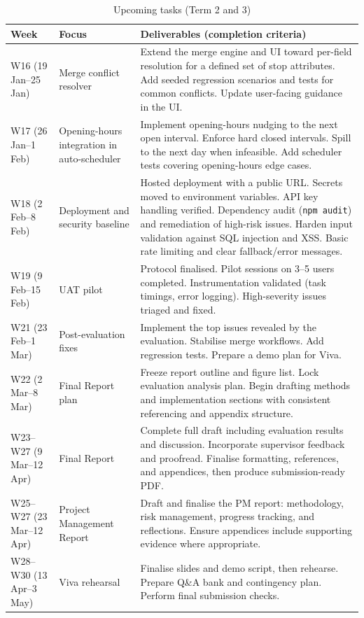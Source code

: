 \begin{table}[H]
\centering
\renewcommand{\arraystretch}{1.12}
\begin{tabularx}{\textwidth}{|>{\raggedright\arraybackslash}p{}|>{\raggedright\arraybackslash}p{}|X|}
\hline
\textbf{Week} & \textbf{Focus} & \textbf{Deliverables (completion criteria)} \\
\hline
W16 (19 Jan--25 Jan) & Merge conflict resolver & Extend the merge engine and UI toward per-field resolution for a defined set of stop attributes. Add seeded regression scenarios and tests for common conflicts. Update user-facing guidance in the UI. \\
\hline
W17 (26 Jan--1 Feb) & Opening-hours integration in auto-scheduler & Implement opening-hours nudging to the next open interval. Enforce hard closed intervals. Spill to the next day when infeasible. Add scheduler tests covering opening-hours edge cases. \\
\hline
W18 (2 Feb--8 Feb) & Deployment and security baseline & Hosted deployment with a public URL. Secrets moved to environment variables. API key handling verified. Dependency audit (\texttt{npm audit}) and remediation of high-risk issues. Harden input validation against SQL injection and XSS. Basic rate limiting and clear fallback/error messages. \\
\hline
W19 (9 Feb--15 Feb) & UAT pilot & Protocol finalised. Pilot sessions on 3--5 users completed. Instrumentation validated (task timings, error logging). High-severity issues triaged and fixed. \\
\hline
W21 (23 Feb--1 Mar) & Post-evaluation fixes & Implement the top issues revealed by the evaluation. Stabilise merge workflows. Add regression tests. Prepare a demo plan for Viva. \\
\hline
W22 (2 Mar--8 Mar) & Final Report plan & Freeze report outline and figure list. Lock evaluation analysis plan. Begin drafting methods and implementation sections with consistent referencing and appendix structure. \\
\hline
W23--W27 (9 Mar--12 Apr) & Final Report & Complete full draft including evaluation results and discussion. Incorporate supervisor feedback and proofread. Finalise formatting, references, and appendices, then produce submission-ready PDF. \\
\hline
W25--W27 (23 Mar--12 Apr) & Project Management Report & Draft and finalise the PM report: methodology, risk management, progress tracking, and reflections. Ensure appendices include supporting evidence where appropriate. \\
\hline
W28--W30 (13 Apr--3 May) & Viva rehearsal & Finalise slides and demo script, then rehearse. Prepare Q\&A bank and contingency plan. Perform final submission checks. \\
\hline
\end{tabularx}
\caption{Upcoming tasks (Term 2 and 3)}
\label{tab:remaining-tasks}
\end{table}

